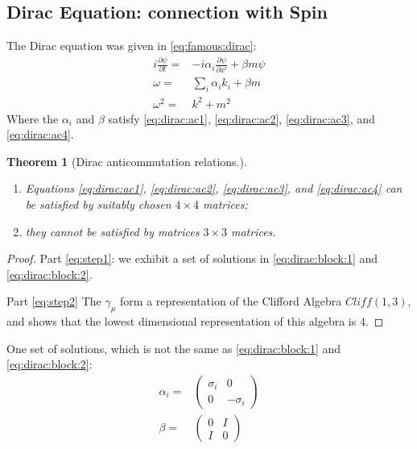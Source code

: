 \documentclass[]{article}
\newtheorem{thm}{Theorem}
\begin{document}
\subsection{Dirac Equation: connection with Spin}

The Dirac equation was given in \eqref{eq:famous:dirac}:
\begin{align*}
	i \frac{\partial \psi}{\partial t} =& - i \alpha_i \frac{\partial \psi}{\partial x^i} + \beta m \psi\\
	\omega =& \sum_i \alpha_i k_i + \beta m\\
	\omega^2 =& k^2 + m^2
\end{align*}
Where the $\alpha_i$ and $\beta$ satisfy \eqref{eq:dirac:ac1}, \eqref{eq:dirac:ac2}, \eqref{eq:dirac:ac3}, and \eqref{eq:dirac:ac4}.

\begin{thm}[Dirac anticommutation relations.]\label{thm:dirac:anticommutation} 
	\begin{enumerate}
		\item Equations \eqref{eq:dirac:ac1}, \eqref{eq:dirac:ac2}, \eqref{eq:dirac:ac3}, and \eqref{eq:dirac:ac4} can be satisfied by suitably chosen $4\times4$ matrices\label{eq:step1};
		\item  they cannot be satisfied by matrices  $3 \times 3$ matrices\label{eq:step2}.
	\end{enumerate}
\end{thm}
\begin{proof}
	 Part \ref{eq:step1}: we exhibit a set of solutions in \eqref{eq:dirac:block:1} and \eqref{eq:dirac:block:2}.
	 
	 Part \ref{eq:step2} The $\gamma_{\mu}$ form a representation of the Clifford Algebra $Cliff(1,3)$, and \cite{randy2024matrix} shows that the lowest dimensional representation of this algebra is 4.
\end{proof}

One set of solutions, which is not the same as \eqref{eq:dirac:block:1} and \eqref{eq:dirac:block:2}:
\begin{align*}
	\alpha_i=&\begin{pmatrix}
		\sigma_i&0\\
		0&-\sigma_i
	\end{pmatrix}\\
	\beta =& \begin{pmatrix}
		0&I\\
		I&0
	\end{pmatrix}
\end{align*}
\end{document}

